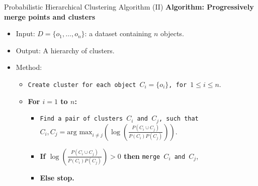 \begin{frame}{Probabilistic Hierarchical Clustering Algorithm (II)}
	\textbf{Algorithm: Progressively merge points and clusters}
	\begin{itemize}
		\item Input: $D = \{o_1, \ldots, o_n\}$: a dataset containing $n$
		      objects.
		\item Output: A hierarchy of clusters.
		\item Method:
		      \begin{itemize}
			      \item \texttt{Create cluster for each object $C_i = \{o_i\}$,
				            for $1 \leq i \leq n$}.
			      \item \textbf{For $i=1$ to $n$:}
			            \begin{itemize}
				            \item \texttt{Find a pair of clusters $C_i$ and $C_j$, such
					                  that}\\
				                  $C_i, C_j = \text{arg max}_{i \neq j} \left( \log\left(
						                  \frac{P(C_i \cup C_j)}{P(C_i)P(C_j)} \right) \right)$.
				            \item \textbf{If $\log\left( \frac{P(C_i \cup
							                  C_j)}{P(C_i)P(C_j)}\right) > 0$ then} \texttt{merge $C_i$
					                  and $C_j$},
				            \item \textbf{Else stop.}
			            \end{itemize}
		      \end{itemize}
	\end{itemize}
\end{frame}
